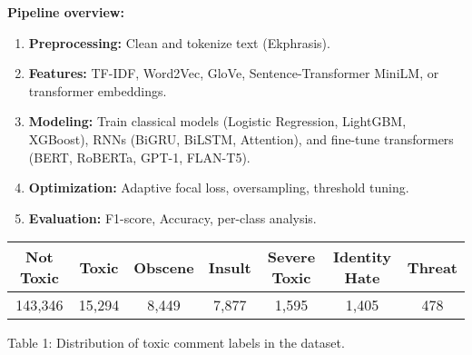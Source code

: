 

{
    \textbf{Pipeline overview:}
    \begin{enumerate}
        \item \textbf{Preprocessing:} Clean and tokenize text (Ekphrasis).
        \item \textbf{Features:} TF-IDF, Word2Vec, GloVe, Sentence-Transformer MiniLM, or transformer embeddings.
        \item \textbf{Modeling:} Train classical models (Logistic Regression, LightGBM, XGBoost), RNNs (BiGRU, BiLSTM, Attention), and fine-tune transformers (BERT, RoBERTa, GPT-1, FLAN-T5).
        \item \textbf{Optimization:} Adaptive focal loss, oversampling, threshold tuning.
        \item \textbf{Evaluation:} F1-score, Accuracy, per-class analysis.
    \end{enumerate}

    \vspace{0.5em}

    \begin{center}
        \begin{tabular}{|c|c|c|c|c|c|c|}
            \hline
            Not Toxic & Toxic & Obscene & Insult & Severe Toxic & Identity Hate & Threat \\
            \hline
            143,346 & 15,294 & 8,449 & 7,877 & 1,595 & 1,405 & 478 \\
            \hline
        \end{tabular}

        \vspace{0.5em}
        Table 1: Distribution of toxic comment labels in the dataset.
    \end{center}
}

